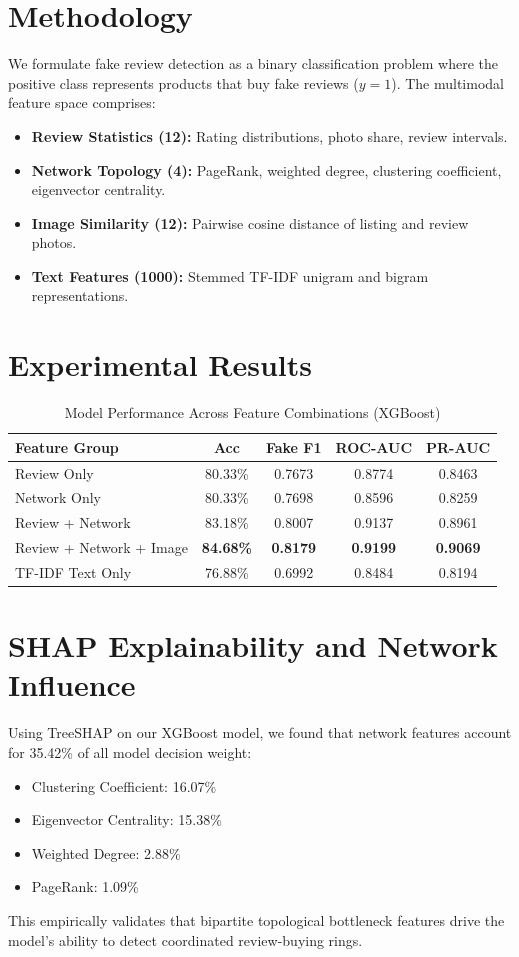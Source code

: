 \documentclass[conference]{IEEEtran}
\begin{document}
\section{Methodology}
We formulate fake review detection as a binary classification problem where the positive class represents products that buy fake reviews ($y=1$).
The multimodal feature space comprises:
\begin{itemize}
    \item \textbf{Review Statistics (12):} Rating distributions, photo share, review intervals.
    \item \textbf{Network Topology (4):} PageRank, weighted degree, clustering coefficient, eigenvector centrality.
    \item \textbf{Image Similarity (12):} Pairwise cosine distance of listing and review photos.
    \item \textbf{Text Features (1000):} Stemmed TF-IDF unigram and bigram representations.
\end{itemize}

\section{Experimental Results}
\begin{table}[htbp]
\caption{Model Performance Across Feature Combinations (XGBoost)}
\begin{center}
\begin{tabular}{lcccc}
\toprule
\textbf{Feature Group} & \textbf{Acc} & \textbf{Fake F1} & \textbf{ROC-AUC} & \textbf{PR-AUC} \\
\midrule
Review Only & 80.33\% & 0.7673 & 0.8774 & 0.8463 \\
Network Only & 80.33\% & 0.7698 & 0.8596 & 0.8259 \\
Review + Network & 83.18\% & 0.8007 & 0.9137 & 0.8961 \\
Review + Network + Image & \textbf{84.68\%} & \textbf{0.8179} & \textbf{0.9199} & \textbf{0.9069} \\
TF-IDF Text Only & 76.88\% & 0.6992 & 0.8484 & 0.8194 \\
\bottomrule
\end{tabular}
\end{center}
\end{table}

\section{SHAP Explainability and Network Influence}
Using TreeSHAP on our XGBoost model, we found that network features account for 35.42\% of all model decision weight:
\begin{itemize}
    \item Clustering Coefficient: 16.07\%
    \item Eigenvector Centrality: 15.38\%
    \item Weighted Degree: 2.88\%
    \item PageRank: 1.09\%
\end{itemize}
This empirically validates that bipartite topological bottleneck features drive the model's ability to detect coordinated review-buying rings.
\end{document}
